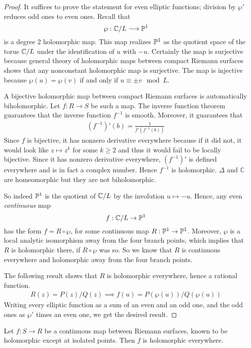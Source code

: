\documentclass[12pt]{article}
\begin{document}
\begin{proof}
It suffices to prove the statement for even elliptic functions; division by $\wp'$ reduces odd ones to even ones. 
Recall that 
\[
\wp : \C/L \longrightarrow \P^1
\]
is a degree $2$ holomorphic map. 
This map realizes $\P^1$ as the quotient space of the torus $\C/L$ under the identification of $u$ with $-u$. Certainly the map is surjective because general theory of holomorphic maps between compact Riemann surfaces shows that any nonconstant holomorphic map is surjective. The map is injective because $\wp(u) = \wp(v)$ if and only if $u \equiv \pm v \mod L$. 

A bijective holomorphic map between compact Riemann surfaces is automatically biholomorphic.
Let $f:R \to S$ be such a map. The inverse function theorem guarantees that the inverse function $f^{-1}$ is smooth. Moreover, it guarantees that
    \begin{align*}
        (f^{-1})'(b) = \frac{1}{f'(f^{-1}(b))}
    \end{align*}
    Since $f$ is bijective, it has nonzero derivative everywhere because if it did not, it would look like $z\mapsto z^k$ for some $k\geq 2$ and thus it would fail to be locally bijective. Since it has nonzero derivative everywhere, $(f^{-1})'$ is defined everywhere and is in fact a complex number. Hence $f^{-1}$ is holomorphic. $\Delta$ and $\mathbb{C}$ are homeomorphic but they are not biholomorphic. 

So indeed $\P^1$ is the quotient of $\C/L$ by the involution $u \mapsto -u$. Hence, any even \emph{continuous} map 
\[
f : \C/L \to \P^1
\]
has the form $f = R \circ \wp$, for some continuous map $R : \P^1 \to \P^1$. 
Moreover, $\wp$ is a local analytic isomorphism away from the four branch points, which implies that $R$ is holomorphic there, if $R \circ \wp$ was so. So we know that $R$ is continuous everywhere and holomorphic away from the four branch points. 

The following result shows that $R$ is holomorphic everywhere, hence a rational function. \begin{align*}
    R(z) = P(z)/Q(z) \implies f(u) = P(\wp(u))/Q(\wp(u))
\end{align*} Writing every elliptic function as a sum of an even and an odd one, and the odd ones as $\wp'$ times an even one, we get the desired result.
\end{proof}

\begin{proposition}
Let $f : S \to R$ be a continuous map between Riemann surfaces, known to be holomorphic except at isolated points. 
Then $f$ is holomorphic everywhere.
\end{proposition}
\end{document}
